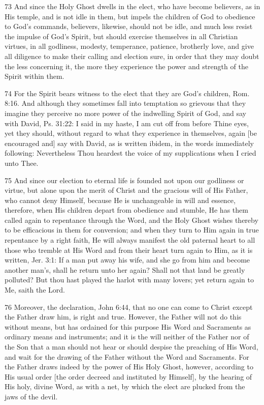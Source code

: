 {73 And since the Holy Ghost dwells in the elect, who have become believers, as in His temple, and is not idle in them, but impels the children of God to obedience to God’s commands, believers, likewise, should not be idle, and much less resist the impulse of God’s Spirit, but should exercise themselves in all Christian virtues, in all godliness, modesty, temperance, patience, brotherly love, and give all diligence to make their calling and election sure, in order that they may doubt the less concerning it, the more they experience the power and strength of the Spirit within them.

74 For the Spirit bears witness to the elect that they are God’s children, Rom. 8:16. And although they sometimes fall into temptation so grievous that they imagine they perceive no more power of the indwelling Spirit of God, and say with David, Ps. 31:22: I said in my haste, I am cut off from before Thine eyes, yet they should, without regard to what they experience in themselves, again [be encouraged and] say with David, as is written ibidem, in the words immediately following: Nevertheless Thou heardest the voice of my supplications when I cried unto Thee.

75 And since our election to eternal life is founded not upon our godliness or virtue, but alone upon the merit of Christ and the gracious will of His Father, who cannot deny Himself, because He is unchangeable in will and essence, therefore, when His children depart from obedience and stumble, He has them called again to repentance through the Word, and the Holy Ghost wishes thereby to be efficacious in them for conversion; and when they turn to Him again in true repentance by a right faith, He will always manifest the old paternal heart to all those who tremble at His Word and from their heart turn again to Him, as it is written, Jer. 3:1: If a man put away his wife, and she go from him and become another man’s, shall he return unto her again? Shall not that land be greatly polluted? But thou hast played the harlot with many lovers; yet return again to Me, saith the Lord.

76 Moreover, the declaration, John 6:44, that no one can come to Christ except the Father draw him, is right and true. However, the Father will not do this without means, but has ordained for this purpose His Word and Sacraments as ordinary means and instruments; and it is the will neither of the Father nor of the Son that a man should not hear or should despise the preaching of His Word, and wait for the drawing of the Father without the Word and Sacraments. For the Father draws indeed by the power of His Holy Ghost, however, according to His usual order [the order decreed and instituted by Himself], by the hearing of His holy, divine Word, as with a net, by which the elect are plucked from the jaws of the devil.

}
